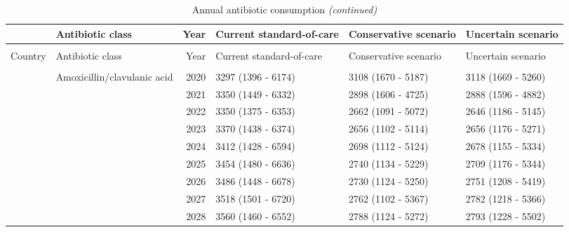 \documentclass[
]{article}
\begin{document}
\begin{landscape}\begingroup\fontsize{7}{9}\selectfont

\begin{longtable}[t]{llrlll}
\caption{\label{tab:ab-consum}Annual antibiotic consumption}\\
\toprule
 & Antibiotic class & Year & Current standard-of-care & Conservative scenario & Uncertain scenario\\
\midrule
\endfirsthead
\caption[]{\label{tab:ab-consum}Annual antibiotic consumption \textit{(continued)}}\\
\toprule
Country & Antibiotic class & Year & Current standard-of-care & Conservative scenario & Uncertain scenario\\
\midrule
\endhead

\endfoot
\bottomrule
\endlastfoot
\addlinespace[0.3em]
\multicolumn{6}{l}{\textbf{Netherlands}}\\
\hspace{1em} & Amoxicillin/clavulanic acid & 2020 & 3297 (1396 - 6174) & 3108 (1670 - 5187) & 3118 (1669 - 5260)\\
\cmidrule{3-6}\nopagebreak
\hspace{1em} &  & 2021 & 3350 (1449 - 6332) & 2898 (1606 - 4725) & 2888 (1596 - 4882)\\
\cmidrule{3-6}\nopagebreak
\hspace{1em} &  & 2022 & 3350 (1375 - 6353) & 2662 (1091 - 5072) & 2646 (1186 - 5145)\\
\cmidrule{3-6}\nopagebreak
\hspace{1em} &  & 2023 & 3370 (1438 - 6374) & 2656 (1102 - 5114) & 2656 (1176 - 5271)\\
\cmidrule{3-6}\nopagebreak
\hspace{1em} &  & 2024 & 3412 (1428 - 6594) & 2698 (1112 - 5124) & 2678 (1155 - 5334)\\
\cmidrule{3-6}\nopagebreak
\hspace{1em} &  & 2025 & 3454 (1480 - 6636) & 2740 (1134 - 5229) & 2709 (1176 - 5344)\\
\cmidrule{3-6}\nopagebreak
\hspace{1em} &  & 2026 & 3486 (1448 - 6678) & 2730 (1124 - 5250) & 2751 (1208 - 5419)\\
\cmidrule{3-6}\nopagebreak
\hspace{1em} &  & 2027 & 3518 (1501 - 6720) & 2762 (1102 - 5367) & 2782 (1218 - 5366)\\
\cmidrule{3-6}\nopagebreak
\hspace{1em} &  & 2028 & 3560 (1460 - 6552) & 2788 (1124 - 5272) & 2793 (1228 - 5502)\\

\end{longtable}
\end{landscape}
\end{document}
